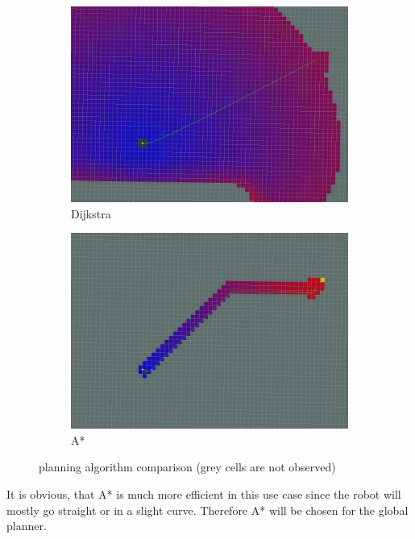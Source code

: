 \begin{figure}[H]
	\begin{subfigure}{.5\linewidth}
		\includegraphics[width=\textwidth]{Pictures/Dijkstra}
		\caption{Dijkstra}
	\end{subfigure}	
	\begin{subfigure}{.5\linewidth}
		\includegraphics[width=\textwidth]{Pictures/AStar2}
		\caption{A*}
	\end{subfigure}

	\caption{planning algorithm comparison (grey cells are not observed)\cite{globalplanner}}
	\label{plannercomparison}

\end{figure}


It is obvious, that A* is much more efficient in this use case since the robot will mostly go straight or in a slight curve. Therefore A* will be chosen for the global planner.\\

